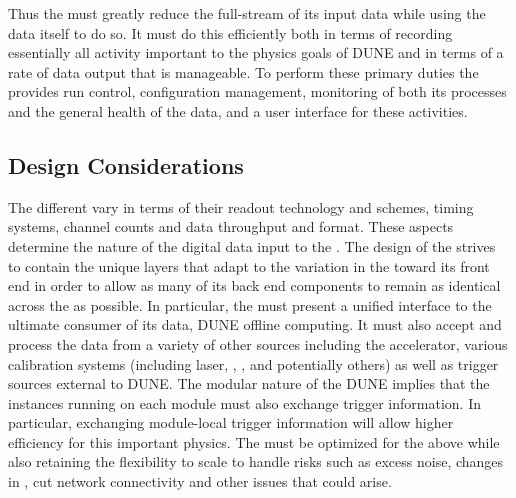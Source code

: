 Thus the  must greatly reduce the full-stream of its input data
while using the data itself to do so. 
It must do this efficiently both in terms of recording essentially all
activity important to the physics goals of DUNE and in terms of a rate of data output 
that is manageable.  
To perform these primary duties the  %
provides run
control, configuration management, monitoring of both its processes
and the general health of the data, and a user interface for these activities.

\subsection{Design Considerations}
\label{sec:fd-daq-des-consid}

The different  vary in terms of their
readout technology and schemes, timing systems, channel counts and data
throughput and format.
These aspects determine the nature of the digital data input
to the . 
The design of the  strives to contain the unique layers that adapt
to the variation in the  toward its front end in
order to allow as many of its back end components to remain as identical across
the  as possible. 
In particular, the  must present a unified interface to the
ultimate consumer of its data, DUNE offline computing.
It must also accept and process the data from a variety of other
sources including the accelerator, various calibration systems
(including laser, , , and potentially
others) as well as trigger sources external to DUNE.
The modular nature of the DUNE  implies that the  instances running
on each module must also exchange trigger information. 
In particular, exchanging module-local  trigger information
will allow higher efficiency for this important physics.
The  must be optimized for the above while also retaining
the flexibility to scale to handle risks such as excess noise,
changes in , cut network connectivity and other issues that could arise. %

